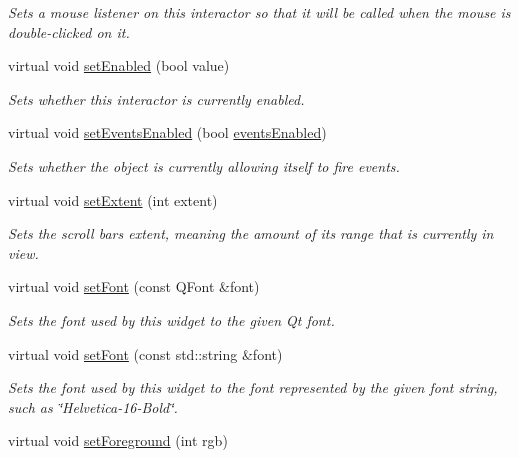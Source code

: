 \begin{DoxyCompactItemize}
\begin{DoxyCompactList}\small\item\em Sets a mouse listener on this interactor so that it will be called when the mouse is double-\/clicked on it. \end{DoxyCompactList}\item 
virtual void \mbox{\hyperlink{classGInteractor_ab831367dd84bbd579e02e55bacb21343}{set\+Enabled}} (bool value)
\begin{DoxyCompactList}\small\item\em Sets whether this interactor is currently enabled. \end{DoxyCompactList}\item 
virtual void \mbox{\hyperlink{classGObservable_afaa30b2a9e0f378fd1c70d2f1d0b8216}{set\+Events\+Enabled}} (bool \mbox{\hyperlink{classGInteractor_a597a370b592e3737d38d9d2f4e2031ea}{events\+Enabled}})
\begin{DoxyCompactList}\small\item\em Sets whether the object is currently allowing itself to fire events. \end{DoxyCompactList}\item 
virtual void \mbox{\hyperlink{classGScrollBar_a2b06f746a9b7b56cbb85154bbe3288c6}{set\+Extent}} (int extent)
\begin{DoxyCompactList}\small\item\em Sets the scroll bar\textquotesingle{}s extent, meaning the amount of its range that is currently in view. \end{DoxyCompactList}\item 
virtual void \mbox{\hyperlink{classGInteractor_a2592348886ffea646c6534bf88f7c49d}{set\+Font}} (const Q\+Font \&font)
\begin{DoxyCompactList}\small\item\em Sets the font used by this widget to the given Qt font. \end{DoxyCompactList}\item 
virtual void \mbox{\hyperlink{classGInteractor_a8e096e8818d838aceae1d46d58fb3a7b}{set\+Font}} (const std\+::string \&font)
\begin{DoxyCompactList}\small\item\em Sets the font used by this widget to the font represented by the given font string, such as \char`\"{}\+Helvetica-\/16-\/\+Bold\char`\"{}. \end{DoxyCompactList}\item 
virtual void \mbox{\hyperlink{classGInteractor_a9eb856b5ff83a19df3831a31f15f4563}{set\+Foreground}} (int rgb)

\end{DoxyCompactItemize}
